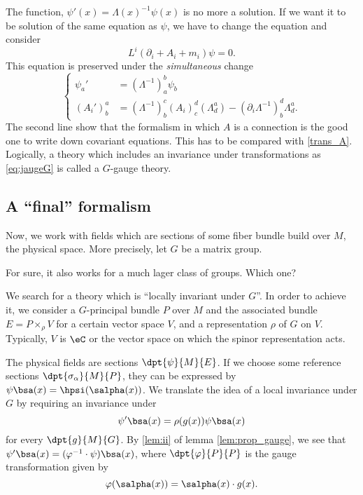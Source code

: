 The function, $\psi'(x)=\Lambda(x)^{-1}\psi(x)$ is no more a solution. If we want it to be solution of the same equation as $\psi$, we have to change the equation and consider
\[
   L^i(\partial_i+A_i+m_i)\psi=0.
\]
This equation is preserved under the \emph{simultaneous} change
\begin{equation}\label{eq:jaugeG}
    \left\{\begin{aligned}
	   \psi_a'&=(\Lambda^{-1})^b_a\psi_b\\
           (A_i')^a_b&=(\Lambda^{-1})^c_b (A_i)^d_c(\Lambda^a_d)-(\partial_i\Lambda^{-1})^d_b\Lambda^a_d.
          \end{aligned}\right.
\end{equation}
The second line show that the formalism in which $A$ is a connection is the good one to write down covariant equations. This has to be compared with \eqref{trans_A}. Logically, a theory which includes an invariance under transformations as \eqref{eq:jaugeG} is called a $G$-gauge theory.

\subsection{A ``final'' formalism}

Now, we work with fields which are sections of some fiber bundle build over $M$, the physical space. More precisely, let $G$ be a matrix group. 

\begin{probleme}
	For sure, it also works for a much lager class of groups. Which one?
\end{probleme}


We search for a theory which is ``locally invariant under $G$''. In order to achieve it, we consider a $G$-principal bundle $P$ over $M$ and the associated bundle $E=P\times_{\rho}V$ for a certain vector space $V$, and a representation $\rho$ of $G$ on $V$. Typically, $V$ is $\eC$ or the vector space on which the spinor representation acts.

The physical fields are sections $\dpt{\psi}{M}{E}$. If we choose some reference sections $\dpt{\sigma_{\alpha}}{M}{P}$, they can be expressed by $\psi\bsa(x)=\hpsi(\salpha(x))$. We translate the idea of a local invariance under $G$ by requiring an invariance under
\[
     \psi'\bsa(x)=\rho(g(x))\psi\bsa(x)
\]
for every $\dpt{g}{M}{G}$. By \ref{lem:ii} of lemma \ref{lem:prop_gauge}, we see that $\psi'\bsa(x)=(\varphi^{-1}\cdot\psi)\bsa(x)$, where $\dpt{\varphi}{P}{P}$ is the gauge transformation given by
\[
   \varphi(\salpha(x))=\salpha(x)\cdot g(x).
\]

